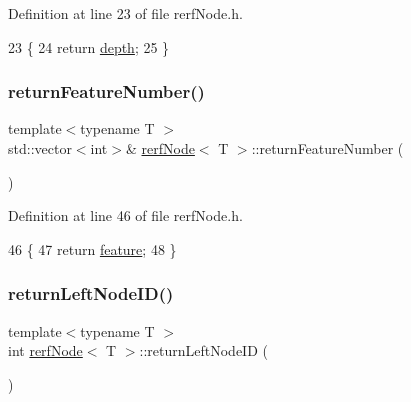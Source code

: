 Definition at line 23 of file rerf\+Node.\+h.


\begin{DoxyCode}
23                                 \{
24             \textcolor{keywordflow}{return} \hyperlink{classrerfNode_a85845e08b7db33d241ddc3ff6b63799f}{depth};
25         \}
\end{DoxyCode}
\mbox{\label{classrerfNode_aa51d1f5df455856bda7af94f1799760f}} 
\subsubsection{\texorpdfstring{return\+Feature\+Number()}{returnFeatureNumber()}}
{\footnotesize\ttfamily template$<$typename T $>$ \\
std\+::vector$<$int$>$\& \hyperlink{classrerfNode}{rerf\+Node}$<$ T $>$\+::return\+Feature\+Number (\begin{DoxyParamCaption}{ }\end{DoxyParamCaption})\hspace{0.3cm}{\ttfamily [inline]}}



Definition at line 46 of file rerf\+Node.\+h.


\begin{DoxyCode}
46                                                     \{
47             \textcolor{keywordflow}{return} \hyperlink{classrerfNode_af41edc70aae781312c3b20311430a89a}{feature};
48         \}
\end{DoxyCode}
\mbox{\label{classrerfNode_ad6ff2fef3621b52280f1bb2b3e9f23d5}} 
\subsubsection{\texorpdfstring{return\+Left\+Node\+I\+D()}{returnLeftNodeID()}}
{\footnotesize\ttfamily template$<$typename T $>$ \\
int \hyperlink{classrerfNode}{rerf\+Node}$<$ T $>$\+::return\+Left\+Node\+ID (\begin{DoxyParamCaption}{ }\end{DoxyParamCaption})\hspace{0.3cm}{\ttfamily [inline]}}



